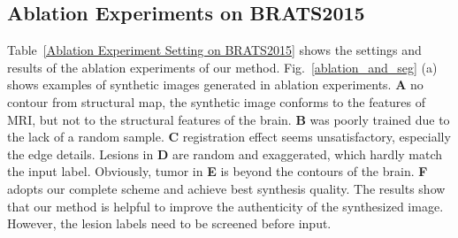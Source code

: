 \documentclass[runningheads]{llncs}
\begin{document}
	\subsection{Ablation Experiments on BRATS2015}
	Table~\ref{Ablation Experiment Setting on BRATS2015} shows the settings and results of the ablation experiments of our method.
	Fig.~\ref{ablation_and_seg} (a) shows examples of synthetic images generated in ablation experiments. 
	\textbf{A} no contour from structural map, the synthetic image conforms to the features of MRI, but not to the structural features of the brain. 
	\textbf{B} was poorly trained due to the lack of a random sample.
	\textbf{C} registration effect seems unsatisfactory, especially the edge details.
	Lesions in \textbf{D} are random and exaggerated, which hardly match the input label. 
	Obviously, tumor in \textbf{E} is beyond the contours of the brain. 
	\textbf{F} adopts our complete scheme and achieve best synthesis quality. The results show that our method is helpful to improve the authenticity of the synthesized image. However, the lesion labels need to be screened before input.
	
\end{document}
